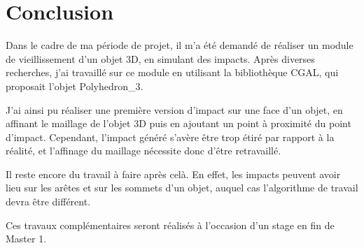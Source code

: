 \documentclass[a4paper,french]{report}
\begin{document}
	\chapter{Conclusion}
		Dans le cadre de ma période de projet, il m'a été demandé de réaliser un module de vieillissement d'un objet 3D, en simulant des impacts. Après diverses recherches, j'ai travaillé sur ce module en utilisant la bibliothèque CGAL, qui proposait l'objet Polyhedron\_3. \par
		J'ai ainsi pu réaliser une première version d'impact sur une face d'un objet, en affinant le maillage de l'objet 3D puis en ajoutant un point à proximité du point d'impact. Cependant, l'impact généré s'avère être trop étiré par rapport à la réalité, et l'affinage du maillage nécessite donc d'être retravaillé. \par
		Il reste encore du travail à faire après celà. En effet, les impacts peuvent avoir lieu sur les arêtes et sur les sommets d'un objet, auquel cas l'algorithme de travail devra être différent. \par
		Ces travaux complémentaires seront réalisés à l'occasion d'un stage en fin de Master 1.
	
	\newpage


		
\end{document}
